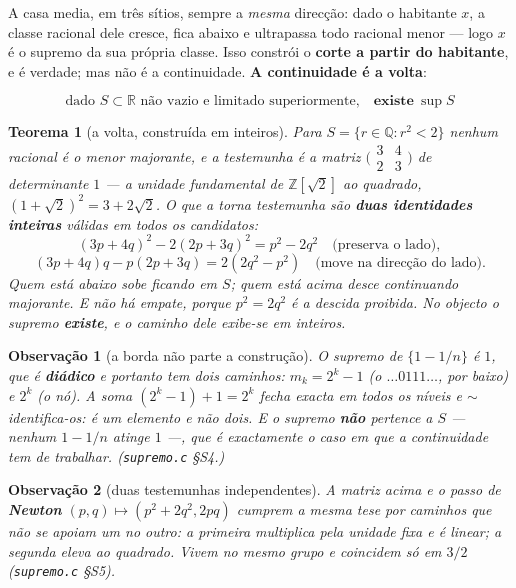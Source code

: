 \documentclass[11pt,a4paper]{article}
\newtheorem{teorema}{Teorema}
\newtheorem{observacao}{Observação}
\newcommand{\code}[1]{\texttt{\small #1}}
\newcommand{\Q}{\mathbb{Q}}
\newcommand{\R}{\mathbb{R}}
\begin{document}
\noindent A casa media, em três sítios, sempre a \emph{mesma} direcção: dado o
habitante $x$, a classe racional dele cresce, fica abaixo e ultrapassa todo
racional menor --- logo $x$ é o supremo da sua própria classe. Isso constrói o
\textbf{corte a partir do habitante}, e é verdade; mas não é a continuidade.
\textbf{A continuidade é a volta}:

\[
\boxed{\;\text{dado }S\subset\R\text{ não vazio e limitado superiormente,}
\quad\textbf{existe}\ \sup S\;}
\]

\begin{teorema}[a volta, construída em inteiros]\label{thm:sup}
Para $S=\{r\in\Q: r^{2}<2\}$ nenhum racional é o menor majorante, e a
testemunha é a matriz $\bigl(\begin{smallmatrix}3&4\\2&3\end{smallmatrix}\bigr)$
de determinante $1$ --- a unidade fundamental de $\mathbb{Z}[\sqrt2]$ ao
quadrado, $(1+\sqrt2)^{2}=3+2\sqrt2$. O que a torna testemunha são \textbf{duas
identidades inteiras} válidas em todos os candidatos:
\[
(3p+4q)^{2}-2(2p+3q)^{2}=p^{2}-2q^{2}
\quad\text{(preserva o lado)},
\]
\[
(3p+4q)q-p(2p+3q)=2(2q^{2}-p^{2})
\quad\text{(move na direcção do lado)}.
\]
Quem está abaixo sobe ficando em $S$; quem está acima desce continuando
majorante. E não há empate, porque $p^{2}=2q^{2}$ é a descida proibida. No
objecto o supremo \textbf{existe}, e o caminho dele exibe-se em inteiros.
\end{teorema}

\begin{observacao}[a borda não parte a construção]
O supremo de $\{1-1/n\}$ é $1$, que é \textbf{diádico} e portanto tem dois
caminhos: $m_k=2^{k}-1$ (o $\ldots0111\ldots$, por baixo) e $2^{k}$ (o nó). A
soma $(2^{k}-1)+1=2^{k}$ fecha \emph{exacta} em todos os níveis e $\sim$
identifica-os: é \emph{um} elemento e não dois. E o supremo \textbf{não}
pertence a $S$ --- nenhum $1-1/n$ atinge $1$ ---, que é exactamente o caso em
que a continuidade tem de trabalhar. (\code{supremo.c} §S4.)
\end{observacao}

\begin{observacao}[duas testemunhas independentes]
A matriz acima e o passo de \textbf{Newton} $(p,q)\mapsto(p^{2}+2q^{2},2pq)$
cumprem a mesma tese por caminhos que não se apoiam um no outro: a primeira
multiplica pela unidade fixa e é \emph{linear}; a segunda \emph{eleva ao
quadrado}. Vivem no mesmo grupo e coincidem só em $3/2$ (\code{supremo.c} §S5).
\end{observacao}
\end{document}
